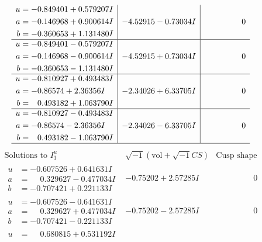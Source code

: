 \documentclass[1p]{elsarticle_modified}
\theoremstyle{definition}
\newcommand{\I}{\sqrt{-1}}
\begin{document}
$$\begin{array}{c|c|c}
\begin{aligned}
u &= -0.849401 + 0.579207 I \\
a &= -0.146968 + 0.900614 I \\
b &= -0.360653 + 1.131480 I\end{aligned}
 & -4.52915 - 0.73034 I & \phantom{-0.000000 } 0 \\ \hline\begin{aligned}
u &= -0.849401 - 0.579207 I \\
a &= -0.146968 - 0.900614 I \\
b &= -0.360653 - 1.131480 I\end{aligned}
 & -4.52915 + 0.73034 I & \phantom{-0.000000 } 0 \\ \hline\begin{aligned}
u &= -0.810927 + 0.493483 I \\
a &= -0.86574 + 2.36356 I \\
b &= \phantom{-}0.493182 + 1.063790 I\end{aligned}
 & -2.34026 + 6.33705 I & \phantom{-0.000000 } 0 \\ \hline\begin{aligned}
u &= -0.810927 - 0.493483 I \\
a &= -0.86574 - 2.36356 I \\
b &= \phantom{-}0.493182 - 1.063790 I\end{aligned}
 & -2.34026 - 6.33705 I & \phantom{-0.000000 } 0\\
 \hline 
 \end{array}$$\newpage$$\begin{array}{c|c|c}  
\text{Solutions to }I^u_{1}& \I (\text{vol} + \sqrt{-1}CS) & \text{Cusp shape}\\
 \hline 
\begin{aligned}
u &= -0.607526 + 0.641631 I \\
a &= \phantom{-}0.329627 - 0.477034 I \\
b &= -0.707421 + 0.221133 I\end{aligned}
 & -0.75202 + 2.57285 I & \phantom{-0.000000 } 0 \\ \hline\begin{aligned}
u &= -0.607526 - 0.641631 I \\
a &= \phantom{-}0.329627 + 0.477034 I \\
b &= -0.707421 - 0.221133 I\end{aligned}
 & -0.75202 - 2.57285 I & \phantom{-0.000000 } 0 \\ \hline\begin{aligned}
u &= \phantom{-}0.680815 + 0.531192 I \\

\end{aligned}
\end{array}$$
\end{document}
